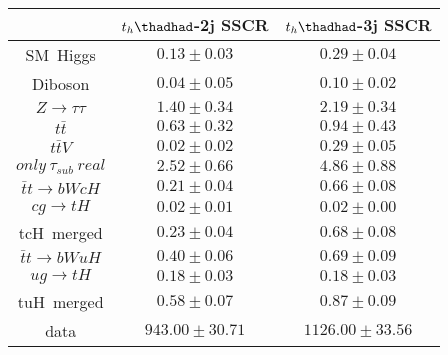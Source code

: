 \centering
\begin{tabular}{ccc} \toprule\toprule
 & $t_{h}\thadhad$-2j SSCR & $t_{h}\thadhad$-3j SSCR \\  \midrule
\hspace{9mm}SM~Higgs & $0.13\pm0.03$ & $0.29\pm0.04$\\
\hspace{9mm}Diboson & $0.04\pm0.05$ & $0.10\pm0.02$\\
\hspace{9mm}$Z\to\tau\tau$ & $1.40\pm0.34$ & $2.19\pm0.34$\\
\hspace{9mm}$t\bar{t}$ & $0.63\pm0.32$ & $0.94\pm0.43$\\
\hspace{9mm}$t\bar{t}V$ & $0.02\pm0.02$ & $0.29\pm0.05$\\
\hspace{9mm}$only~\tau_{sub}~real$ & $2.52\pm0.66$ & $4.86\pm0.88$\\
\hspace{9mm}$\bar{t}t\to bWcH$ & $0.21\pm0.04$ & $0.66\pm0.08$\\
\hspace{9mm}$cg\to tH$ & $0.02\pm0.01$ & $0.02\pm0.00$\\ \midrule
tcH~merged & $0.23\pm0.04$ & $0.68\pm0.08$\\
\hspace{9mm}$\bar{t}t\to bWuH$ & $0.40\pm0.06$ & $0.69\pm0.09$\\
\hspace{9mm}$ug\to tH$ & $0.18\pm0.03$ & $0.18\pm0.03$\\
tuH~merged & $0.58\pm0.07$ & $0.87\pm0.09$\\\midrule
data & $943.00\pm30.71$ & $1126.00\pm33.56$\\
\bottomrule\bottomrule
\end{tabular}

